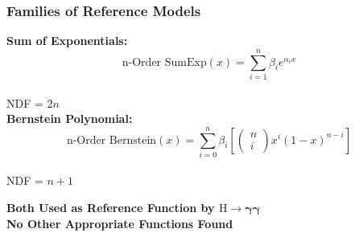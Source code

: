 \documentclass{beamer}
\newcommand{\hgamgam}{\ensuremath{\mathrm{H} \rightarrow \gamma\gamma}}
\begin{document}
\begin{frame}
\frametitle{Families of Reference Models}
\textbf{Sum of Exponentials:}
\\
\[ \mbox{n-Order SumExp}(x) = \sum^n_{i=1}\beta_i e^{\alpha_i x}\]
\\
\hspace{6.5em} NDF = 2$n$
\vspace{1ex}
\\
\textbf{Bernstein Polynomial:}
\[ 
\mbox{n-Order Bernstein}(x) = \sum^n_{i=0}\beta_i 
\left[
\left( \begin{array}{cc}
n \\ i
\end{array} \right)
x^i(1-x)^{n-i}
\right]
\]
\\
\hspace{6.5em} NDF = $n+1$
\\
\begin{center}
\textbf{
Both Used as Reference Function by $\bm{\hgamgam{}}$
\\
No Other Appropriate Functions Found
}
\end{center}

\end{frame}
\end{document}
